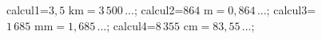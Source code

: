 \documentclass[exercice]{thedocument}%
\begin{document}
%
    \>calcul1=$3,5\text{ km}=3\,500\,...$;%
    \>calcul2=$864\text{ m}=0,864\,...$;%
    \>calcul3=$1\,685\text{ mm}=1,685\,...$;%
    \>calcul4=$8\,355\text{ cm}=83,55\,...$;%
\end{document}

